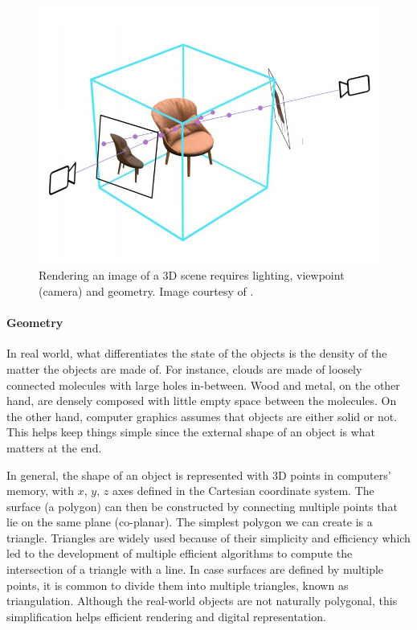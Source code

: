 \begin{figure}
  \centering
   \includegraphics[width=0.7\linewidth]{Images/scene_with_camera.jpg}
   \caption{Rendering an image of a 3D scene requires lighting, viewpoint (camera) and geometry. Image courtesy of \citeauthor{boss2021nerd} \cite{boss2021nerd}.}
   \label{fig:teaser}
\end{figure}


\paragraph{Geometry}
In real world, what differentiates the state of the objects is the density of the matter the objects are made of. For instance, clouds are made of loosely connected molecules with large holes in-between. Wood and metal, on the other hand, are densely composed with little empty space between the molecules. On the other hand, computer graphics assumes that objects are either solid or not. This helps keep things simple since the external shape of an object is what matters at the end. 


In general, the shape of an object is represented with 3D points in computers' memory, with $x$, $y$, $z$ axes defined in the Cartesian coordinate system. The surface (a polygon) can then be constructed by connecting multiple points that lie on the same plane (co-planar). The simplest polygon we can create is a triangle. Triangles are widely used because of their simplicity and efficiency which led to the development of multiple efficient algorithms to compute the intersection of a triangle with a line. In case surfaces are defined by multiple points, it is common to  divide them into multiple triangles, known as triangulation. Although the real-world objects are not naturally polygonal, this simplification helps efficient rendering and digital representation.

